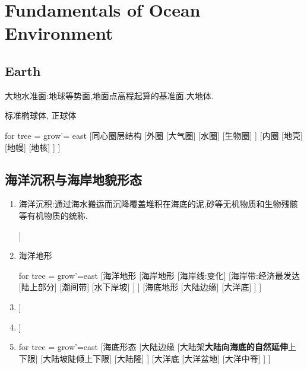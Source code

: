 \section{Fundamentals of Ocean Environment}
	\subsection{Earth}
		大地水准面:地球等势面,地面点高程起算的基准面.大地体.
		
		标准椭球体,	正球体
		\begin{forest}
			for tree = {grow'= east}
			[同心圈层结构
				[外圈
					[大气圈]
					[水圈]
					[生物圈]
					]
				[内圈
					[地壳]
					[地幔]
					[地核]
					]
				]
		\end{forest}
	\subsection{海洋沉积与海岸地貌形态}
	\begin{enumerate}[1)]
		\item 海洋沉积:通过海水搬运而沉降覆盖堆积在海底的泥,砂等无机物质和生物残骸等有机物质的统称.
			\begin{forest}
				[沉积物来源
					[陆源物质]
					[生物残骸]
					[火山物质]
					[宇宙物质]
					[化学沉淀物]
					]
			\end{forest}
		
		\item 海洋地形
			\begin{forest}
				for tree = {grow'=east}
				[海洋地形
					[海岸地形
						[海岸线:变化]
						[海岸带:经济最发达
							[陆上部分]
							[潮间带]
							[水下岸坡]
							]
						]
					[海底地形
						[大陆边缘]
						[大洋底]
						]	
					]
			\end{forest}
		\item 
			\begin{forest}
				[海蚀作用
					[冲蚀作用]
					[磨蚀作用]
					[溶蚀作用]
					]
			\end{forest}
		\item 
			\begin{forest}
				[海岸类型
					[基岩海岸]
					[沙砾质海岸]
					[淤泥质海岸]
					[生物海岸]
				]
			\end{forest}
		\item 
			\begin{forest}
				for tree = {grow'=east}
				[海底形态
					[大陆边缘
						[大陆架\textbf{大陆向海底的自然延伸}上下限]
						[大陆坡陡倾上下限]
						[大陆隆]
						]
					[大洋底
						[大洋盆地]
						[大洋中脊]
						]
					]	
			\end{forest}
			
	\end{enumerate}
	
